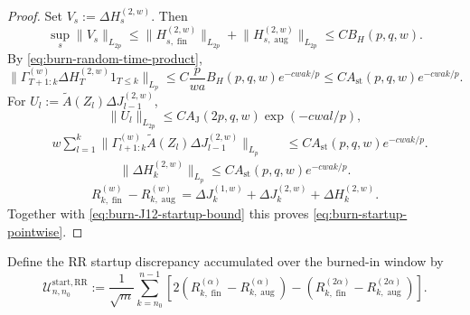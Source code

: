 \begin{proof}
Set $V_{s} := \Delta H_{s}^{(2,w)}$. Then
\[
\sup_{s} \lVert V_{s} \rVert_{L_{2p}}
  \le \lVert H_{s, \operatorname{fin}}^{(2,w)} \rVert_{L_{2p}}
     + \lVert H_{s, \operatorname{aug}}^{(2,w)} \rVert_{L_{2p}}
  \le C B_{H}(p,q,w).
\]
By \eqref{eq:burn-random-time-product},
\begin{equation}
\lVert \Gamma_{T + 1:k}^{(w)} \Delta H_{T}^{(2,w)} 1_{T \le k} \rVert_{L_{p}}
  \le C \frac{p}{w a} B_{H}(p,q,w) e^{-c w a k / p}
  \le C A_{\mathrm{st}}(p,q,w) e^{-c w a k / p}.
\label{eq:burn-H2-initial-term}
\end{equation}
For $U_{l} := \tilde{A}(Z_{l}) \Delta J_{l - 1}^{(2,w)}$,
\[
\lVert U_{l} \rVert_{L_{2p}}
  \le C A_{\mathrm{J}}(2p,q,w) \exp\left(-c w a l / p\right),
\]
\begin{equation}
\begin{aligned}
& w \sum_{l = 1}^{k}
  \lVert \Gamma_{l + 1:k}^{(w)} \tilde{A}(Z_{l})
     \Delta J_{l - 1}^{(2,w)} \rVert_{L_{p}}
&\quad \le C A_{\mathrm{st}}(p,q,w) e^{-c w a k / p}.
\end{aligned}
\label{eq:burn-H2-convolution-term}
\end{equation}
\begin{equation}
\lVert \Delta H_{k}^{(2,w)} \rVert_{L_{p}}
  \le C A_{\mathrm{st}}(p,q,w) e^{-c w a k / p}.
\label{eq:burn-H2-startup-bound}
\end{equation}
\[
R_{k, \operatorname{fin}}^{(w)} - R_{k, \operatorname{aug}}^{(w)}
  = \Delta J_{k}^{(1,w)} + \Delta J_{k}^{(2,w)} + \Delta H_{k}^{(2,w)}.
\]
Together with \eqref{eq:burn-J12-startup-bound} this proves
\eqref{eq:burn-startup-pointwise}. \end{proof}

Define the RR startup discrepancy accumulated over the burned-in window by
\begin{equation}
\mathcal{U}_{n,n_{0}}^{\mathrm{start,RR}}
  := \frac{1}{\sqrt{m}} \sum_{k = n_{0}}^{n - 1}
    \left[ 2 \left( R_{k, \operatorname{fin}}^{(\alpha)}
             - R_{k, \operatorname{aug}}^{(\alpha)} \right)
      - \left( R_{k, \operatorname{fin}}^{(2 \alpha)}
             - R_{k, \operatorname{aug}}^{(2 \alpha)} \right) \right].
\label{eq:burn-startup-discrepancy}
\end{equation}

